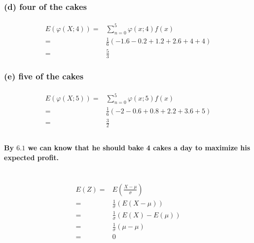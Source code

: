 \documentclass{article}
\begin{document}
            \subsubsection*{   (d) four of the cakes}
            \paragraph{
                \begin{equation*}
                    \begin{split}
                        E(\varphi(X;4))=&\sum _{n=0} ^5 \varphi(x;4)f(x)\\
                                    =&\frac{1}{6}(-1.6-0.2+1.2+2.6+4+4)\\
                                    =&\frac{5}{3}
                    \end{split}
                \end{equation*}
            }
            \subsubsection*{    (e) five of the cakes}
            \paragraph{
                \begin{equation*}
                    \begin{split}
                        E(\varphi(X;5))=&\sum _{n=0} ^5 \varphi(x;5)f(x)\\
                                    =&\frac{1}{6}(-2-0.6+0.8+2.2+3.6+5)\\
                                    =&\frac{3}{2}
                    \end{split}
                \end{equation*}
            }
        \subsection{}
            \paragraph{
                By $6.1$ we can know that he should bake 4 cakes a day to maximize his expected profit.
            }
    
    \section{}
            \begin{equation*}
                \begin{split}
                    E(Z)=&E(\frac{X-\mu}{\sigma})\\
                        =&\frac{1}{\sigma}(E(X-\mu))\\
                        =&\frac{1}{\sigma}(E(X)-E(\mu))\\
                        =&\frac{1}{\sigma}(\mu-\mu)\\
                        =&0
                \end{split}
            \end{equation*}
\end{document}
